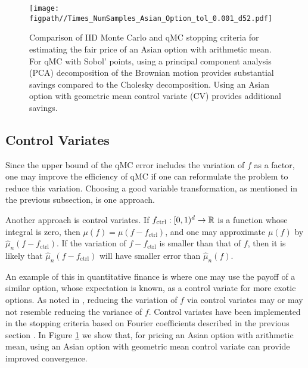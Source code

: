 \documentclass{svproc}
\newcommand{\figpath}{Figures}
\begin{document}
\begin{figure}
	\centering
    \texttt{[image: \\figpath//Times\_NumSamples\_Asian\_Option\_tol\_0.001\_d52.pdf]}
	\caption{Comparison of IID Monte Carlo and qMC stopping criteria for estimating the fair price of an Asian option with arithmetic mean. For qMC with Sobol' points, using a principal component analysis (PCA) decomposition of the Brownian motion provides substantial savings compared to the Cholesky decomposition. Using an Asian option with geometric mean control variate (CV) provides additional savings. \label{fig:asian_option_pda_vs_chol}}
\end{figure}

\subsection{Control Variates} 

Since the upper bound of the qMC error includes the variation of $f$ as a factor, one may improve the efficiency of qMC if one can reformulate the problem to reduce this variation.  Choosing a good variable transformation, as mentioned in the previous subsection, is one approach.  

Another approach is control variates.  If $f_{\text{ctrl}} : [0,1)^d \to {\mathbb{R}}$ is a function whose integral is zero, then $\mu(f) = \mu(f - f_{\text{ctrl}})$, and one may approximate $\mu(f)$ by $\hat{\mu}_n(f - f_{\text{ctrl}})$.  If the variation of  $f - f_{\text{ctrl}}$ is smaller than that of $f$, then it is likely that $\hat{\mu}_n(f - f_{\text{ctrl}})$ will have smaller error than $\hat{\mu}_n(f)$. 

An example of this in quantitative finance is where one may use the payoff of a similar option, whose expectation is known, as a control variate for more exotic options.  As noted in \cite{HicEtal03}, reducing the variation of $f$ via control variates may or may not resemble reducing the variance of $f$.  Control variates have been implemented in the stopping criteria based on Fourier coefficients described in the previous section \cite{HicEtal17a}. In Figure \ref{fig:asian_option_pda_vs_chol} we show that, for pricing an Asian option with arithmetic mean, using an Asian option with geometric mean control variate can provide improved convergence.
\end{document}
